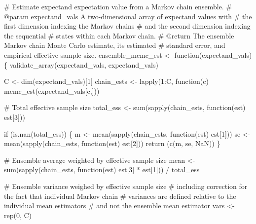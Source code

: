 \documentclass[
  letterpaper,
  DIV=11,
  numbers=noendperiod]{scrartcl}
\newenvironment{Shaded}{\begin{snugshade}}{\end{snugshade}}
\newcommand{\BuiltInTok}[1]{\textcolor[rgb]{0.00,0.23,0.31}{#1}}
\newcommand{\CommentTok}[1]{\textcolor[rgb]{0.37,0.37,0.37}{#1}}
\newcommand{\ControlFlowTok}[1]{\textcolor[rgb]{0.00,0.23,0.31}{#1}}
\newcommand{\DecValTok}[1]{\textcolor[rgb]{0.68,0.00,0.00}{#1}}
\newcommand{\KeywordTok}[1]{\textcolor[rgb]{0.00,0.23,0.31}{#1}}
\newcommand{\NormalTok}[1]{\textcolor[rgb]{0.00,0.23,0.31}{#1}}
\newcommand{\OperatorTok}[1]{\textcolor[rgb]{0.37,0.37,0.37}{#1}}
\newcommand{\StringTok}[1]{\textcolor[rgb]{0.13,0.47,0.30}{#1}}
\begin{document}
\begin{Shaded}
\begin{Highlighting}[]
\CommentTok{\# Estimate expectand expectation value from a Markov chain ensemble.}
\CommentTok{\# @param expectand\_vals A two{-}dimensional array of expectand values with}
\CommentTok{\#                       the first dimension indexing the Markov chains}
\CommentTok{\#                       and the second dimension indexing the sequential}
\CommentTok{\#                       states within each Markov chain.}
\CommentTok{\# @return The ensemble Markov chain Monte Carlo estimate, its estimated}
\CommentTok{\#         standard error, and empirical effective sample size.}
\NormalTok{ensemble\_mcmc\_est }\OperatorTok{\textless{}{-}}\NormalTok{ function(expectand\_vals) \{}
\NormalTok{  validate\_array(expectand\_vals, }\StringTok{\textquotesingle{}expectand\_vals\textquotesingle{}}\NormalTok{)}
  
\NormalTok{  C }\OperatorTok{\textless{}{-}}\NormalTok{ dim(expectand\_vals)[}\DecValTok{1}\NormalTok{]}
\NormalTok{  chain\_ests }\OperatorTok{\textless{}{-}}\NormalTok{ lapply(}\DecValTok{1}\NormalTok{:C, function(c) mcmc\_est(expectand\_vals[c,]))}
  
  \CommentTok{\# Total effective sample size}
\NormalTok{  total\_ess }\OperatorTok{\textless{}{-}} \BuiltInTok{sum}\NormalTok{(sapply(chain\_ests, function(est) est[}\DecValTok{3}\NormalTok{]))}
  
  \ControlFlowTok{if}\NormalTok{ (}\KeywordTok{is}\NormalTok{.nan(total\_ess)) \{}
\NormalTok{    m }\OperatorTok{\textless{}{-}}\NormalTok{ mean(sapply(chain\_ests, function(est) est[}\DecValTok{1}\NormalTok{]))}
\NormalTok{    se }\OperatorTok{\textless{}{-}}\NormalTok{ mean(sapply(chain\_ests, function(est) est[}\DecValTok{2}\NormalTok{]))}
    \ControlFlowTok{return}\NormalTok{ (c(m, se, NaN))}
\NormalTok{  \}}
  
  \CommentTok{\# Ensemble average weighted by effective sample size}
\NormalTok{  mean }\OperatorTok{\textless{}{-}} \BuiltInTok{sum}\NormalTok{(sapply(chain\_ests,}
\NormalTok{                     function(est) est[}\DecValTok{3}\NormalTok{] }\OperatorTok{*}\NormalTok{ est[}\DecValTok{1}\NormalTok{])) }\OperatorTok{/}\NormalTok{ total\_ess}
  
  \CommentTok{\# Ensemble variance weighed by effective sample size}
  \CommentTok{\# including correction for the fact that individual Markov chain}
  \CommentTok{\# variances are defined relative to the individual mean estimators}
  \CommentTok{\# and not the ensemble mean estimator}
  \BuiltInTok{vars} \OperatorTok{\textless{}{-}}\NormalTok{ rep(}\DecValTok{0}\NormalTok{, C)}
  

\end{Highlighting}
\end{Shaded}
\end{document}
